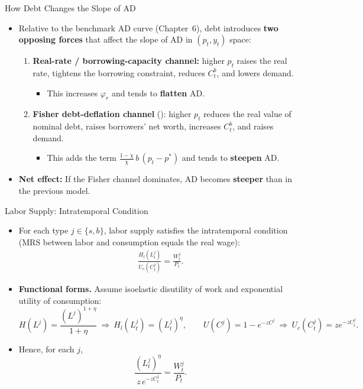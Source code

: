 \documentclass[11pt,aspectratio=169]{beamer}
\begin{document}
\begin{frame}{How Debt Changes the Slope of AD}
\small
\begin{itemize}
  \item Relative to the benchmark AD curve (Chapter~6), debt introduces \textbf{two opposing forces} that affect the slope of AD in $(p_t,y_t)$ space:
  \begin{enumerate}
    \item \textbf{Real-rate / borrowing-capacity channel:}
    higher $p_t$ raises the real rate, tightens the borrowing constraint, reduces $C_t^b$, and lowers demand.
    \begin{itemize}
      \item This increases $\varphi_r$ and tends to \textbf{flatten} AD.
    \end{itemize}
    \vspace{0.35em}
    \item \textbf{Fisher debt-deflation channel} (\cite{fisher1933}):
    higher $p_t$ reduces the real value of nominal debt, raises borrowers' net worth, increases $C_t^b$, and raises demand.
    \begin{itemize}
      \item This adds the term $\frac{1-\chi}{\chi}\,b\,(p_t-p^\ast)$ and tends to \textbf{steepen} AD.
    \end{itemize}
  \end{enumerate}
  \vspace{0.2em}
  \item \textbf{Net effect:} If the Fisher channel dominates, AD becomes \textbf{steeper} than in the previous model.
\end{itemize}
\end{frame}
\begin{frame}{Labor Supply: Intratemporal Condition}
\small
\begin{itemize}
  \item For each type $j\in\{s,b\}$, labor supply satisfies the intratemporal condition
  (MRS between labor and consumption equals the real wage):
  \begin{align}
    \frac{H_l(L_t^j)}{U_c(C_t^j)}=\frac{W_t^j}{P_t}.
    \label{eq10}
  \end{align}

  \vspace{0.35em}
  \item \textbf{Functional forms.} Assume isoelastic disutility of work and exponential utility of consumption:
  \[
    H(L^j)=\frac{(L^j)^{1+\eta}}{1+\eta}
    \ \Rightarrow\ 
    H_l(L_t^j)=(L_t^j)^\eta,
    \qquad
    U(C^j)=1-e^{-zC^j}
    \ \Rightarrow\ 
    U_c(C_t^j)=z e^{-zC_t^j}.
  \]
  \item Hence, for each $j$,
  \[
    \frac{(L_t^j)^\eta}{z\,e^{-zC_t^j}}=\frac{W_t^j}{P_t}.
  \]
\end{itemize}
\end{frame}
\end{document}
